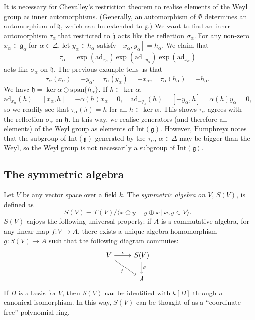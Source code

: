\documentclass[12pt]{amsart}
\newcommand{\g}{\mathfrak{g}}
\newcommand{\h}{\mathfrak{h}}
\newcommand{\ad}{\mathrm{ad}}
\theoremstyle{remark}
\theoremstyle{remark}
\theoremstyle{remark}
\begin{document}
It is necessary for Chevalley's restriction theorem to realise elements of the Weyl group as inner automorphisms.
(Generally, an automorphism of $\Phi$ determines an automorphism of $\h$, which can be extended to $\g$.)
We want to find an inner automorphism $\tau_\alpha$ that restricted to $\h$ acts like the reflection $\sigma_\alpha$.
For any non-zero $x_\alpha \in \g_\alpha$ for $\alpha \in \Delta$, let $y_\alpha \in h_\alpha$ satisfy $[x_\alpha, y_\alpha]=h_\alpha$.
We claim that 
$$\tau_\alpha = \exp(\ad_{x_\alpha})\exp(\ad_{-y_\alpha})\exp(\ad_{x_\alpha})$$
acts like $\sigma_\alpha$ on $\h$.
The previous example tells us that
$$\tau_\alpha(x_\alpha) = - y_\alpha, \quad \tau_\alpha(y_\alpha) = - x_\alpha, \quad \tau_\alpha(h_\alpha) = -h_\alpha.$$
We have $\h = \ker \alpha \oplus \mathrm{span} \{h_\alpha\}$.
If $h \in \ker \alpha$, 
$$\ad_{x_\alpha}(h) = [x_\alpha, h] = - \alpha(h) x_\alpha = 0,\quad \ad_{-y_\alpha}(h) = [-y_\alpha, h] = \alpha(h) y_\alpha =0,$$
so we readily see that $\tau_\alpha(h) = h$ for all $h \in \ker \alpha$.
This shows $\tau_\alpha$ agrees with the reflection $\sigma_\alpha$ on $\h$.
In this way, we realise generators (and therefore all elements) of the Weyl group as elements of $\mathrm{Int}(\g)$.
However, Humphreys \cite[\S 14.3]{Humphreys72} notes that the subgroup of $\mathrm{Int}(\g)$ generated by the $\tau_\alpha$, $\alpha \in \Delta$ may be bigger than the Weyl, so the Weyl group is not necessarily a subgroup of $\mathrm{Int}(\g)$.

\subsection{The symmetric algebra}
Let $V$ be any vector space over a field $k$.
The \emph{symmetric algebra on $V$}, $S(V)$, is defined as
$$S(V) = T(V) /\langle x \oplus y - y \oplus x \, | \, x, y \in V\rangle.$$
$S(V)$ enjoys the following universal property:
if $A$ is a commutative algebra, for any linear map $f: V \to A$, there exists a unique algebra homomorphism $g: S(V) \to A$ such that the following diagram commutes:
\[\begin{tikzcd}
	V & {S(V)} \\
	& A
	\arrow["\iota", from=1-1, to=1-2]
	\arrow["g", from=1-2, to=2-2]
	\arrow["f"', from=1-1, to=2-2]
\end{tikzcd}\]
If $B$ is a basis for $V$, then $S(V)$ can be identified with $k[B]$ through a canonical isomorphism.
In this way, $S(V)$ can be thought of as a ``coordinate-free'' polynomial ring.
\end{document}
